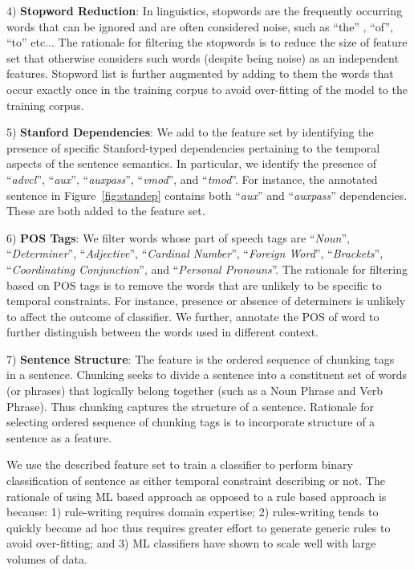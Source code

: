 4) \textbf{Stopword Reduction}: In linguistics, stopwords are the frequently occurring words that can be ignored and are often considered noise, such as ``the'' , ``of'', ``to'' etc... The rationale for filtering the stopwords is to reduce the size of feature set that otherwise considers such words (despite being noise) as an independent features. Stopword list is further augmented by adding to them the words that occur exactly once in the training corpus to avoid over-fitting of the model to the training corpus. 
	
5) \textbf{Stanford Dependencies}: We add to the feature set by identifying the presence of specific Stanford-typed dependencies pertaining to the temporal aspects of the sentence semantics. In particular, we identify the presence of ``\textit{advcl}'', ``\textit{aux}'', ``\textit{auxpass}'', ``\textit{vmod}'', and ``\textit{tmod}''. For instance, the annotated sentence in Figure~\ref{fig:standep} contains both ``\textit{aux}'' and ``\textit{auxpass}'' dependencies. These are both added to the feature set.
	
6) \textbf{POS Tags}: We filter words whose part of speech tags are ``\textit{Noun}'', ``\textit{Determiner}'', ``\textit{Adjective}'', ``\textit{Cardinal Number}'', ``\textit{Foreign Word}'', ``\textit{Brackets}'', ``\textit{Coordinating Conjunction}'', and ``\textit{Personal Pronouns}''. The rationale for filtering based on POS tags is to remove the words that are unlikely to be specific to temporal constraints. For instance, presence or absence of determiners is unlikely to affect the outcome of classifier. We further, annotate the POS of word to further distinguish between the words used in different context.
	
7) \textbf{Sentence Structure}: The feature is the ordered sequence of chunking tags~\cite{Klein03,KleinNIPS03} in a sentence. Chunking seeks to divide a sentence into a constituent set of words (or phrases) that logically belong together (such as a Noun Phrase and Verb Phrase). Thus chunking captures the structure of a sentence. Rationale for selecting ordered sequence of chunking tags is to incorporate structure of a sentence as a feature.  
 

We use the described feature set to train a classifier to perform binary classification of sentence as either temporal constraint describing or not. The rationale of using ML based approach as opposed to a rule based approach is because: 1) rule-writing requires domain expertise; 2) rules-writing tends to quickly become ad hoc thus requires greater effort to generate generic rules to avoid over-fitting; and 3) ML classifiers have shown to scale well with large volumes of data.

